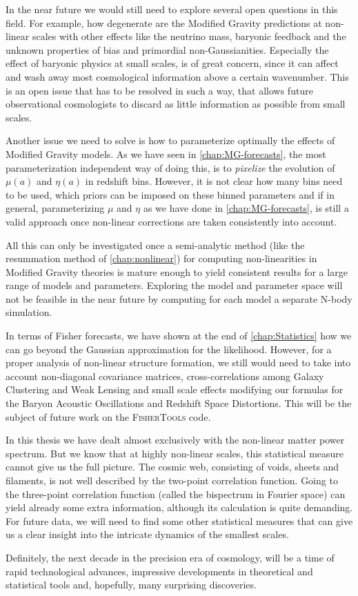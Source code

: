 In the near future we would still need to explore several open questions in this field.
For example, how degenerate are the Modified Gravity predictions at non-linear scales with other
effects like the neutrino mass, baryonic feedback and the unknown properties of bias and primordial non-Gaussianities.
Especially the effect of baryonic physics at small scales, is of great concern, since it can affect and wash away
most cosmological information above a certain wavenumber. This is an open issue that has to be resolved in such a way, that allows 
future observational cosmologists to discard as little information as possible from small scales.

Another issue we need to solve is how to parameterize optimally the effects of Modified Gravity models. As we have seen 
in \cref{chap:MG-forecasts}, the most parameterization independent way of doing this, is to \emph{pixelize} the evolution
of $\mu(a)$ and $\eta(a)$ in redshift bins. However, it is not clear how many bins need to be used, which
priors can be imposed on these binned parameters and if in general, parameterizing $\mu$ and $\eta$ as we have done in 
\cref{chap:MG-forecasts}, is still a valid approach once non-linear corrections are taken consistently into account.

All this can only be investigated once a semi-analytic method (like the resummation method of \cref{chap:nonlinear}) 
for computing non-linearities in Modified Gravity theories is mature enough to yield consistent results for 
a large range of models and parameters. Exploring
the model and parameter space will not be feasible in the near future by computing for each model a separate N-body simulation.

In terms of Fisher forecasts, we have shown at the end of \cref{chap:Statistics} how we can go beyond the Gaussian approximation for the likelihood.
However, for a proper analysis of non-linear structure formation, we still would need to take into account 
non-diagonal covariance matrices, cross-correlations among Galaxy Clustering and Weak Lensing and small scale effects
modifying our formulas for the Baryon Acoustic Oscillations and Redshift Space Distortions. This will be the subject of future
work on the \textsc{FisherTools} code.

In this thesis we have dealt almost exclusively with the non-linear matter power spectrum. But we know that at highly non-linear scales,
this statistical measure cannot give us the full picture. The cosmic web, consisting of voids, sheets and filaments, is not
well described by the two-point correlation function. Going to the three-point correlation function (called the bispectrum in Fourier space)
can yield already some extra information, although its calculation is quite demanding. 
For future data, we will need to find
some other statistical measures that can give us a clear insight into the intricate dynamics of the smallest scales.

Definitely, the next decade in the precision era of cosmology, will be a time of rapid technological advances,
impressive developments in theoretical and statistical tools and, hopefully, 
many surprising discoveries.










